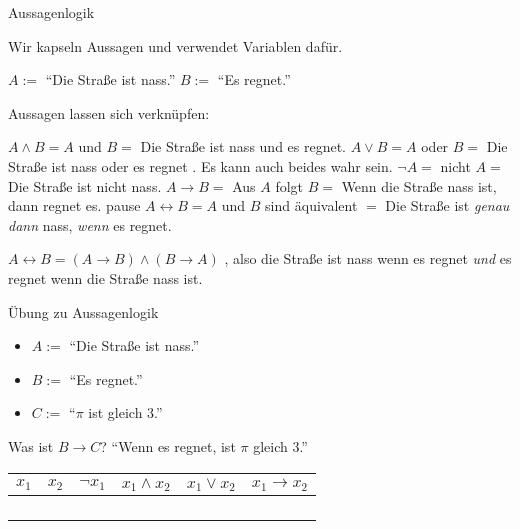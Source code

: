 \documentclass[handout]{beamer}
\begin{document}
\begin{frame}{Aussagenlogik}
	
	Wir kapseln Aussagen und verwendet Variablen dafür. 
	
	\begin{itemize}
		\pitem $A := $ ``Die Straße ist nass.''
		\pitem $B := $ ``Es regnet.''
	\end{itemize}

	\pause Aussagen lassen sich verknüpfen:
	
	\begin{itemize}
		\pitem {} $A \land B = A$ und $B = $ Die Straße ist nass und es regnet.
		\pitem {}  $A \lor B  = A$ oder $B  = $ Die Straße ist nass oder es regnet . Es kann auch beides wahr sein.
		\pitem {}  $\lnot A  = $ nicht $A  = $ Die Straße ist nicht nass.
		\pitem {}  $A \rightarrow B  = $ Aus $A$ folgt $B  = $ Wenn die Straße nass ist, dann regnet es.
		\pitem {}pause $A \leftrightarrow B  = A$ und $B$ sind äquivalent $ = $ Die Straße ist \emph{genau dann} nass, \emph{wenn} es regnet.
		\begin{itemize}
			\pitem $A \leftrightarrow B = (A \rightarrow B) \land (B \rightarrow A)$  , also die Straße ist nass wenn es regnet \emph{und} es regnet wenn die Straße nass ist.
		\end{itemize}
	\end{itemize}

\end{frame}

\begin{frame}{Übung zu Aussagenlogik}
	
	\begin{itemize}
		\item $A := $ ``Die Straße ist nass.''
		\item $B := $ ``Es regnet.''
		\item $C := $ ``$\pi$ ist gleich $3$.''
	\end{itemize}

	\begin{itemize}
		\pitem Was ist $B \rightarrow C$?   ``Wenn es regnet, ist $\pi$ gleich $3$.''
	\end{itemize}

	\pause
	
	\begin{center}
		\begin{tabular}{c|c||c|c|c|c}%
			\hline
			$x_1$ & $x_2$ & $\lnot x_1$ & $x_1 \land x_2$ & $x_1 \lor x_2$ & $x_1 \rightarrow x_2$ \\
			\hline
			\F & \F & \W & \F & \F & \W \\
			\F & \W & \W & \F & \W & \W \\
			\W & \F & \F & \F & \W & \F \\
			\W & \W & \F & \W & \W & \W \\
			\hline
		\end{tabular}
	\end{center}
	
\end{frame}
\end{document}
